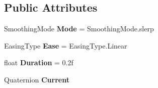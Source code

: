 \subsection*{Public Attributes}
\begin{DoxyCompactItemize}
\item 
\mbox{\label{class_radical_library_1_1_smooth_quaternion_ace7603e6500795d9d9334787f03a730c}} 
Smoothing\+Mode {\bfseries Mode} = Smoothing\+Mode.\+slerp
\item 
\mbox{\label{class_radical_library_1_1_smooth_quaternion_abcd64e7ee93afd9bba94a7cff0a30c44}} 
Easing\+Type {\bfseries Ease} = Easing\+Type.\+Linear
\item 
\mbox{\label{class_radical_library_1_1_smooth_quaternion_ad259915700a8735a90461729e85f27c4}} 
float {\bfseries Duration} = 0.\+2f
\item 
\mbox{\label{class_radical_library_1_1_smooth_quaternion_ad699403357ee442582c0e60ac9ba4a18}} 
Quaternion {\bfseries Current}
\end{DoxyCompactItemize}

